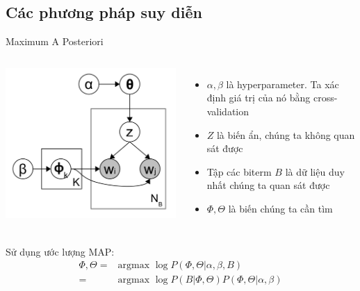 \documentclass[pdf]{beamer}
\begin{document}
\subsection{Các phương pháp suy diễn}
\begin{frame}{Maximum A Posteriori}
\begin{columns}
	\includegraphics[width=\textwidth]{BTM.png}
	\begin{itemize}
		\item $\alpha, \beta$ là hyperparameter. Ta xác định giá trị của nó bằng cross-validation
		\item $Z$ là biến ẩn, chúng ta không quan sát được
		\item Tập các biterm $B$ là dữ liệu duy nhất chúng ta quan sát được
		\item $\Phi, \Theta$ là biến chúng ta cần tìm
	\end{itemize}
\end{columns}
Sử dụng ước lượng MAP:
\begin{align}
\Phi, \Theta =& \text{argmax\ } \log P(\Phi, \Theta | \alpha, \beta, B) \nonumber \\
=& \text{argmax\ } \log P(B | \Phi, \Theta) P(\Phi, \Theta | \alpha, \beta)
\end{align}
\end{frame}
\end{document}
